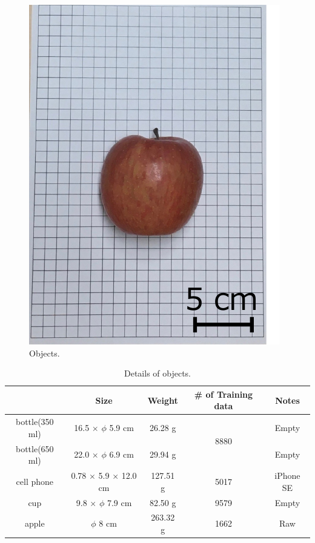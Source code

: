 \begin{figure}[H]
\begin{minipage}{0.19\columnwidth}
        \includegraphics[clip, width=\linewidth]{figure/chapter4/apple}
    \end{minipage}

    \caption{Objects.}
    \label{fig:対象物}
    
\end{figure}

\begin{table}[H]
    \centering
    \caption{Details of objects.}
    \begin{tabular}{ccccc}\toprule
        & Size & Weight & \# of Training data & Notes \\ \midrule
        bottle(350 ml) & 16.5 $\times$ $\phi$ 5.9 cm & 26.28 g & \multirow{2}{*}{8880} & Empty \\ 
        bottle(650 ml) & 22.0 $\times$ $\phi$ 6.9 cm & 29.94 g &  & Empty \\ 
        cell phone & 0.78 $\times$ 5.9 $\times$ 12.0 cm & 127.51 g & 5017 & iPhone SE \\ 
        cup & 9.8 $\times$ $\phi$ 7.9 cm & 82.50 g & 9579 & Empty \\ 
        apple & $\phi$ 8 cm & 263.32 g & 1662 & Raw \\ \bottomrule
    \end{tabular}
    \label{tab:対象物}
\end{table}


